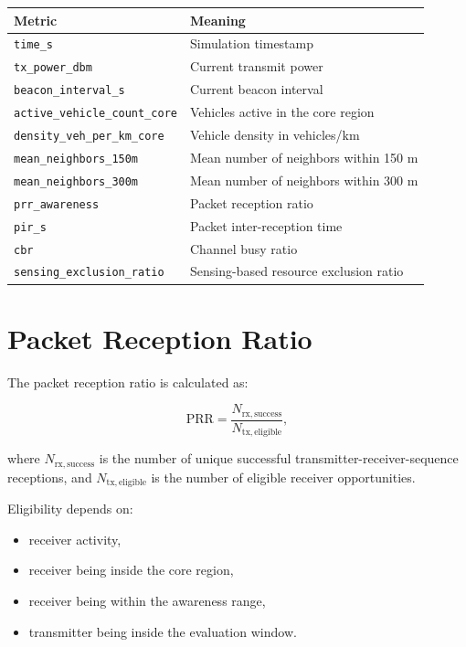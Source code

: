 \documentclass[11pt,a4paper]{article}
\begin{document}
\begin{center}
\begin{tabular}{ll}
\toprule
Metric & Meaning \\
\midrule
\texttt{time\_s} & Simulation timestamp \\
\texttt{tx\_power\_dbm} & Current transmit power \\
\texttt{beacon\_interval\_s} & Current beacon interval \\
\texttt{active\_vehicle\_count\_core} & Vehicles active in the core region \\
\texttt{density\_veh\_per\_km\_core} & Vehicle density in vehicles/km \\
\texttt{mean\_neighbors\_150m} & Mean number of neighbors within 150 m \\
\texttt{mean\_neighbors\_300m} & Mean number of neighbors within 300 m \\
\texttt{prr\_awareness} & Packet reception ratio \\
\texttt{pir\_s} & Packet inter-reception time \\
\texttt{cbr} & Channel busy ratio \\
\texttt{sensing\_exclusion\_ratio} & Sensing-based resource exclusion ratio \\
\bottomrule
\end{tabular}
\end{center}

\section{Packet Reception Ratio}

The packet reception ratio is calculated as:

\begin{equation}
\mathrm{PRR} =
\frac{
N_{\mathrm{rx,success}}
}{
N_{\mathrm{tx,eligible}}
},
\end{equation}

where \(N_{\mathrm{rx,success}}\) is the number of unique successful transmitter-receiver-sequence receptions, and \(N_{\mathrm{tx,eligible}}\) is the number of eligible receiver opportunities.

Eligibility depends on:
\begin{itemize}
    \item receiver activity,
    \item receiver being inside the core region,
    \item receiver being within the awareness range,
    \item transmitter being inside the evaluation window.
\end{itemize}
\end{document}
